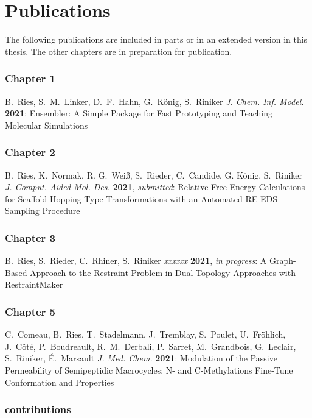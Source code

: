 \chapter{Publications}

The following publications are included in parts or in an extended version in this
thesis. The other chapters are in preparation for publication.

\subsection*{Chapter 1}

B.\ Ries, S.\ M.\ Linker, D.\ F.\ Hahn, G.\ K\"onig, S.\ Riniker {\em J. Chem. Inf. Model.} {\bf 2021}: 
Ensembler: A Simple Package for Fast Prototyping and Teaching Molecular Simulations


\subsection*{Chapter 2}

B.\ Ries, K.\ Normak, R. G.\ Wei\ss, S.\ Rieder, C.\ Candide, G. K\"onig, S.\ Riniker {\em J. Comput. Aided Mol. Des.} {\bf 2021}, {\em submitted}: 
Relative Free-Energy Calculations for Scaffold Hopping-Type Transformations with an Automated RE-EDS Sampling Procedure

\subsection*{Chapter 3}

B.\ Ries, S.\ Rieder, C.\ Rhiner, S.\ Riniker {\em xxxxxx} {\bf 2021}, {\em in progress}:
A Graph-Based Approach to the Restraint Problem in Dual Topology Approaches with RestraintMaker


\subsection*{Chapter 5}

C.\ Comeau, B.\ Ries, T.\ Stadelmann, J.\ Tremblay, S.\ Poulet, U.\ Fröhlich, J.\ Côté, P.\ Boudreault, R.\ M.\ Derbali, P.\ Sarret, M.\ Grandbois, G.\ Leclair, S.\ Riniker, É.\ Marsault {\em J. Med. Chem.} {\bf 2021}:
Modulation of the Passive Permeability of Semipeptidic Macrocycles: N- and C-Methylations Fine-Tune Conformation and Properties




\subsection*{contributions}

